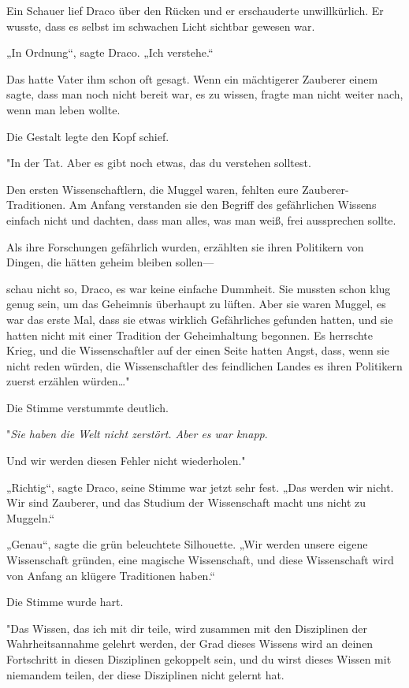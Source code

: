 {Ein Schauer lief Draco über den Rücken und er erschauderte unwillkürlich. Er wusste, dass es selbst im schwachen Licht sichtbar gewesen war.

„In Ordnung“, sagte Draco. „Ich verstehe.“

Das hatte Vater ihm schon oft gesagt. Wenn ein mächtigerer Zauberer einem sagte, dass man noch nicht bereit war, es zu wissen, fragte man nicht weiter nach, wenn man leben wollte.

Die Gestalt legte den Kopf schief.

"In der Tat. Aber es gibt noch etwas, das du verstehen solltest.

Den ersten Wissenschaftlern, die Muggel waren, fehlten eure Zauberer-Traditionen. Am Anfang verstanden sie den Begriff des gefährlichen Wissens einfach nicht und dachten, dass man alles, was man weiß, frei aussprechen sollte.

Als ihre Forschungen gefährlich wurden, erzählten sie ihren Politikern von Dingen, die hätten geheim bleiben sollen—

schau nicht so, Draco, es war keine einfache Dummheit. Sie mussten schon klug genug sein, um das Geheimnis überhaupt zu lüften. Aber sie waren Muggel, es war das erste Mal, dass sie etwas wirklich Gefährliches gefunden hatten, und sie hatten nicht mit einer Tradition der Geheimhaltung begonnen. Es herrschte Krieg, und die Wissenschaftler auf der einen Seite hatten Angst, dass, wenn sie nicht reden würden, die Wissenschaftler des feindlichen Landes es ihren Politikern zuerst erzählen würden…"

Die Stimme verstummte deutlich.

"\emph{Sie haben die Welt nicht zerstört. Aber es war knapp}.

Und wir werden diesen Fehler nicht wiederholen."

„Richtig“, sagte Draco, seine Stimme war jetzt sehr fest. „Das werden wir nicht. Wir sind Zauberer, und das Studium der Wissenschaft macht uns nicht zu Muggeln.“

„Genau“, sagte die grün beleuchtete Silhouette. „Wir werden unsere eigene Wissenschaft gründen, eine magische Wissenschaft, und diese Wissenschaft wird von Anfang an klügere Traditionen haben.“

Die Stimme wurde hart.

"Das Wissen, das ich mit dir teile, wird zusammen mit den Disziplinen der Wahrheitsannahme gelehrt werden, der Grad dieses Wissens wird an deinen Fortschritt in diesen Disziplinen gekoppelt sein, und du wirst dieses Wissen mit niemandem teilen, der diese Disziplinen nicht gelernt hat.

}
